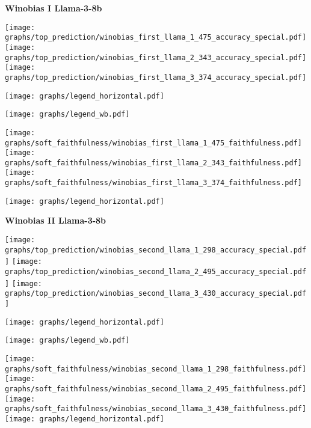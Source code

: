 \begin{figure*}
    \centering
    \textbf{Winobias I Llama-3-8b}


    \texttt{[image: graphs/top\_prediction/winobias\_first\_llama\_1\_475\_accuracy\_special.pdf]} \hfill 
    \texttt{[image: graphs/top\_prediction/winobias\_first\_llama\_2\_343\_accuracy\_special.pdf]} \hfill 
    \texttt{[image: graphs/top\_prediction/winobias\_first\_llama\_3\_374\_accuracy\_special.pdf]} \hfill 

    \vspace{0.05cm}
     \texttt{[image: graphs/legend\_horizontal.pdf]} \hfill 

     
    \vspace{0.05cm}
    
    \texttt{[image: graphs/legend\_wb.pdf]} \hfill     

    
    \vspace{0.05cm}
    \texttt{[image: graphs/soft\_faithfulness/winobias\_first\_llama\_1\_475\_faithfulness.pdf]} \hfill 
    \texttt{[image: graphs/soft\_faithfulness/winobias\_first\_llama\_2\_343\_faithfulness.pdf]} \hfill 
    \texttt{[image: graphs/soft\_faithfulness/winobias\_first\_llama\_3\_374\_faithfulness.pdf]} \hfill 

    \vspace{0.05cm}
     \texttt{[image: graphs/legend\_horizontal.pdf]} \hfill 

     \textbf{Winobias II Llama-3-8b}


    \texttt{[image: graphs/top\_prediction/winobias\_second\_llama\_1\_298\_accuracy\_special.pdf]} \hfill 
    \texttt{[image: graphs/top\_prediction/winobias\_second\_llama\_2\_495\_accuracy\_special.pdf]} \hfill 
    \texttt{[image: graphs/top\_prediction/winobias\_second\_llama\_3\_430\_accuracy\_special.pdf]} \hfill 

    \vspace{0.05cm}
     \texttt{[image: graphs/legend\_horizontal.pdf]} \hfill 

     
    \vspace{0.05cm}
    
    \texttt{[image: graphs/legend\_wb.pdf]} \hfill     

    
    \vspace{0.05cm}
    \texttt{[image: graphs/soft\_faithfulness/winobias\_second\_llama\_1\_298\_faithfulness.pdf]} \hfill 
    \texttt{[image: graphs/soft\_faithfulness/winobias\_second\_llama\_2\_495\_faithfulness.pdf]} \hfill 
    \texttt{[image: graphs/soft\_faithfulness/winobias\_second\_llama\_3\_430\_faithfulness.pdf]} \hfill 
     \vspace{0.05cm}
     \texttt{[image: graphs/legend\_horizontal.pdf]} \hfill 


\end{figure*}

